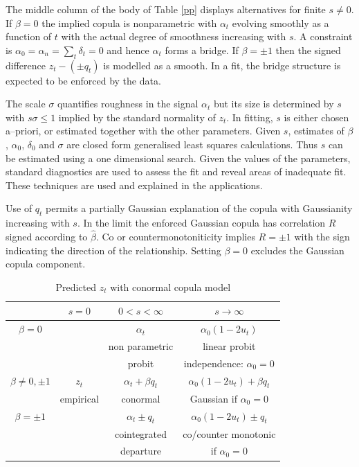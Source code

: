 \documentclass[authoryear]{elsarticle}
\newcommand{\tref}[1]{Table \ref{#1}}
\begin{document}
The middle column of the body of \tref{pp} displays alternatives for finite $s\ne 0$.   If $\beta=0$  the implied copula is nonparametric with $\alpha_t$ evolving smoothly as a function of $t$ with the actual degree of smoothness increasing with $s$.  A constraint is $\alpha_0=\alpha_n=\sum_t\delta_t=0$ and hence $\alpha_t$ forms a bridge.  If $\beta=\pm 1$ then the signed difference $z_t-(\pm q_t)$ is modelled as a smooth. In a fit, the  bridge structure is expected to be enforced by the data.

The scale  $\sigma$ quantifies roughness in the signal $\alpha_t$ but its size is determined by $s$ with $s\sigma\le 1$ implied by the standard normality of $z_t$.   
In fitting, $s$ is either chosen a--priori, or estimated together with the other parameters. Given $s$, estimates of  $\beta$, $\alpha_0$, $\delta_0$ and $\sigma$ are closed form generalised least squares calculations.    Thus $s$ can be estimated  using a one dimensional search.   Given the values of the parameters,  standard diagnostics are used to assess the fit and reveal areas of inadequate fit.  These techniques are used and explained in the applications.



Use of $q_t$ permits  a partially Gaussian explanation of the copula with  Gaussianity increasing with $s$.   In the limit the enforced Gaussian copula has correlation $R$ signed according to $\hat\beta$.  Co or  countermonotoniticity implies $R=\pm 1$ with the sign indicating the direction of the relationship.  Setting $\beta=0$  excludes the Gaussian copula  component.



\begin{table}[htdp]
\caption{Predicted $z_t$ with conormal copula model}\label{ppp}
\begin{center}
\begin{tabular}{c||c|c|c}
\hline
&$s=0$& $0<s<\infty$ &$s\rightarrow\infty$\\
\hline\hline
$\beta=0$&& $\alpha_t$&$\alpha_0(1-2u_t)$ \\
& & non parametric& linear probit\\
& & probit & independence: $\alpha_0=0$ \\
\cline{1-1}\cline{3-4}
$\beta\ne 0,\pm 1$  & $z_t$ & $\alpha_t+\beta q_t$ &$\alpha_0(1-2u_t)+\beta q_t$\\
&empirical & conormal & Gaussian if $\alpha_0=0$\\
\cline{1-1}\cline{3-4}
$\beta=\pm 1$& & $\alpha_t\pm q_t$& $\alpha_0(1-2u_t)\pm q_t$ \\
& & cointegrated & co/counter monotonic \\
& & departure & if $\alpha_0=0$ \\
\hline
\end{tabular}
\end{center}
\end{table}%
\end{document}
